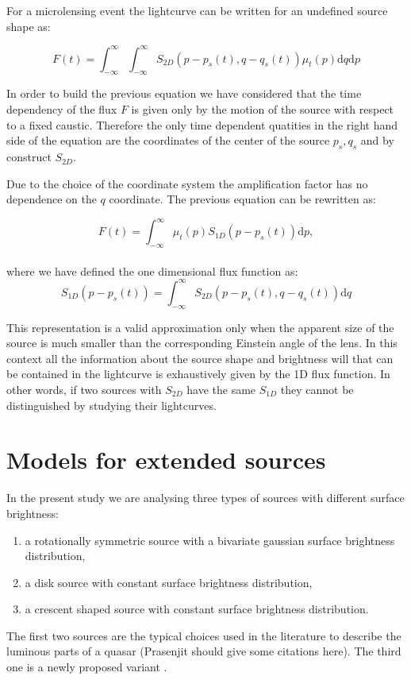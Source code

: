 For a microlensing event the lightcurve can be written for an undefined source shape as:

\begin{equation}
 F(t) = \int_{-\infty}^\infty \int_{-\infty}^\infty S_{2D}(p-p_s(t), q-q_s(t)) \mu_t(p) \mathrm{d}q \mathrm{d}p
 \label{eqn:ft2d}
\end{equation}

In order to build the previous equation we have considered that the time dependency of the flux $F$ is given only by the motion of the source with respect to a fixed caustic. Therefore the only time dependent quatities in the right hand side of the equation
are the coordinates of the center of the source $p_s,q_s$ and by construct $S_{2D}$. 

Due to the choice of the coordinate system the amplification factor has no dependence on the $q$ coordinate. The previous equation can be rewritten as:

\begin{equation}
 F(t) 
= \int_{-\infty}^\infty  \mu_t(p) S_{1D}\left(p-p_s(t)\right) \mathrm{d}p,
\label{eqn:ft}
\end{equation}
\\
where we have defined the one dimensional flux function as:
\begin{equation}
 S_{1D}(p-p_s(t)) = \int_{-\infty}^\infty S_{2D}(p-p_s(t), q-q_s(t)) \mathrm{d}q
\end{equation}

This representation is a valid approximation only when the apparent size of the source is much smaller than the corresponding Einstein angle of the lens. In this context 
all the information about the source shape and brightness will that can be contained in the lightcurve is exhaustively given by the 1D flux function.
In other words, if two sources with $S_{2D}$ have the same $S_{1D}$ they cannot be distinguished by studying their lightcurves.
 
 
\section{Models for extended sources}

In the present study we are analysing three types of sources with different surface brightness: 
\begin{enumerate}
 \renewcommand{\theenumi}{(\arabic{enumi})}
  \item a rotationally symmetric source with a bivariate gaussian surface brightness distribution,
  \item a disk source with constant surface brightness distribution,
  \item a crescent shaped source with constant surface brightness distribution.
\end{enumerate}
The first two sources are the typical choices used in the literature to describe the luminous parts of a quasar (Prasenjit should give some citations here). The third one is a newly proposed
variant \citep{2013MNRAS.434..765K}.




